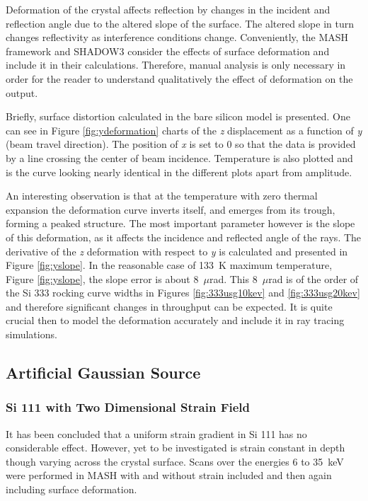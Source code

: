 \documentclass[preprint]{iucr}              %
\begin{document}
Deformation of the crystal affects reflection by changes in the incident and reflection angle due to the altered slope of the surface. The altered slope in turn changes reflectivity as interference conditions change. Conveniently, the MASH framework and SHADOW3 consider the effects of surface deformation and include it in their calculations. Therefore, manual analysis is only necessary in order for the reader to understand qualitatively the effect of deformation on the output.

Briefly, surface distortion calculated in the bare silicon model is presented. One can see in Figure \ref{fig:ydeformation} charts of the \textit{z} displacement as a function of \textit{y} (beam travel direction). The position of \textit{x} is set to 0 so that the data is provided by a line crossing the center of beam incidence. Temperature is also plotted and is the curve looking nearly identical in the different plots apart from amplitude.

An interesting observation is that at the temperature with zero thermal expansion the deformation curve inverts itself, and emerges from its trough, forming a peaked structure. The most important parameter however is the slope of this deformation, as it affects the incidence and reflected angle of the rays. The derivative of the \textit{z} deformation with respect to \textit{y} is calculated and presented in Figure \ref{fig:yslope}. In the reasonable case of 133~K maximum temperature, Figure \ref{fig:yslope}, the slope error is about 8~$\mu$rad. This 8~$\mu$rad is of the order of the Si 333 rocking curve widths in Figures \ref{fig:333usg10kev} and \ref{fig:333usg20kev} and therefore significant changes in throughput can be expected. It is quite crucial then to model the deformation accurately and include it in ray tracing simulations.

\subsection{Artificial Gaussian Source}\label{gaussian}
\subsubsection{Si 111 with Two Dimensional Strain Field}\label{111simulation}
It has been concluded that a uniform strain gradient in Si 111 has no considerable effect. However, yet to be investigated is strain constant in depth though varying across the crystal surface. Scans over the energies 6 to 35~keV were performed in MASH with and without strain included and then again including surface deformation.
\end{document}
